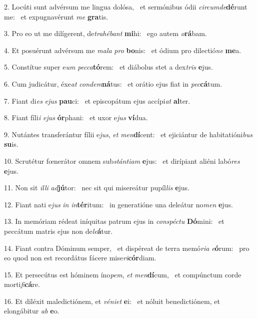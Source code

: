 2. Locúti sunt advérsum me lingua dolósa, \dag\  et sermónibus ódii \textit{cir}\textit{cum}\textit{de}\textbf{dé}runt me: \ast\  et expugnavérunt \textit{me} \textbf{gra}tis.\

3. Pro eo ut me dilígerent, de\textit{tra}\textit{hé}\textit{bant} \textbf{mi}hi: \ast\  ego autem \textit{o}\textbf{rá}bam.\

4. Et posuérunt advérsum me \textit{ma}\textit{la} \textit{pro} \textbf{bo}nis: \ast\  et ódium pro dilectió\textit{ne} \textbf{me}a.\

5. Constítue super e\textit{um} \textit{pec}\textit{ca}\textbf{tó}rem: \ast\  et diábolus stet a dex\textit{tris} \textbf{e}jus.\

6. Cum judicátur, éxe\textit{at} \textit{con}\textit{dem}\textbf{ná}tus: \ast\  et orátio ejus fiat in \textit{pec}\textbf{cá}tum.\

7. Fiant di\textit{es} \textit{e}\textit{jus} \textbf{pau}ci: \ast\  et episcopátum ejus accípi\textit{at} \textbf{al}ter.\

8. Fiant fíli\textit{i} \textit{e}\textit{jus} \textbf{ór}phani: \ast\  et uxor e\textit{jus} \textbf{ví}dua.\

9. Nutántes transferántur fílii e\textit{jus}, \textit{et} \textit{men}\textbf{dí}cent: \ast\  et ejiciántur de habitatióni\textit{bus} \textbf{su}is.\

10. Scrutétur fœnerátor omnem sub\textit{stán}\textit{ti}\textit{am} \textbf{e}jus: \ast\  et dirípiant aliéni labó\textit{res} \textbf{e}jus.\

11. Non sit \textit{il}\textit{li} \textit{ad}\textbf{jú}tor: \ast\  nec sit qui misereátur pupíl\textit{lis} \textbf{e}jus.\

12. Fiant nati e\textit{jus} \textit{in} \textit{in}\textbf{tér}itum: \ast\  in generatióne una deleátur no\textit{men} \textbf{e}jus.\

13. In memóriam rédeat iníquitas patrum ejus in \textit{con}\textit{spéc}\textit{tu} \textbf{Dó}mini: \ast\  et peccátum matris ejus non de\textit{le}\textbf{á}tur.\

14. Fiant contra Dóminum semper, \dag\  et dispéreat de terra memó\textit{ri}\textit{a} \textit{e}\textbf{ó}rum: \ast\  pro eo quod non est recordátus fácere mise\textit{ri}\textbf{cór}diam.\

15. Et persecútus est hóminem íno\textit{pem}, \textit{et} \textit{men}\textbf{dí}cum, \ast\  et compúnctum corde morti\textit{fi}\textbf{cá}re.\

16. Et diléxit maledictiónem, et \textit{vé}\textit{ni}\textit{et} \textbf{e}i: \ast\  et nóluit benedictiónem, et elongábitur \textit{ab} \textbf{e}o.\

